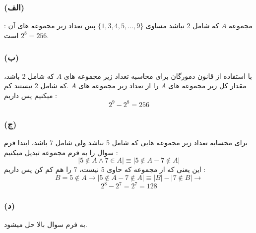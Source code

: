 \documentclass{article}
\begin{document}
			\subsubsection*{(الف)}
				مجموعه $A$ که شامل 2 نباشد مساوی $\{1, 3, 4, 5, ..., 9\}$ پس تعداد زیر مجموعه های آن : $2^8 = 256$ است.
			
			\subsubsection*{(ب)}
				با استفاده از قانون دمورگان برای محاسبه تعداد زیر مجموعه های $A$ که شامل 2 باشد، مقدار کل زیر مجموعه های $A$ را از تعداد زیر مجموعه های $A$ .که شامل 2 نیستند کم میکنیم
				پس داریم :\\
				\[
					2^9 - 2^8 = 256			
				\]

			\subsubsection*{(ج)}
				برای محسابه تعداد زیر مجموعه هایی که شامل 5 نباشد ولی شامل 7 باشد، ابتدا فرم سوال را به فرم مجموعه تبدیل میکنیم :\\
				\[|5 \not \in A \land 7 \in A| \equiv |5 \not \in A - 7 \not \in A|\]
				این یعنی که از مجموعه که حاوی 5 نیست، 7 را هم کم کن پس داریم : \\
				\[B = 5 \not \in A \rightarrow |5 \not \in A - 7 \not \in A| \equiv |B| - |7 \not \in B| \rightarrow\]
				\[2^8 - 2^7 = 2^7 = 128\]

			\subsubsection*{(د)}
				به فرم سوال بالا حل میشود.
\end{document}
